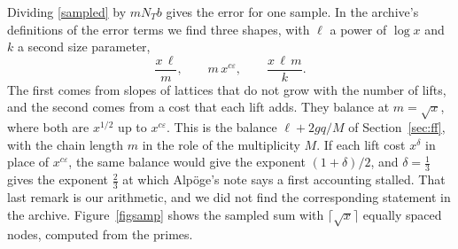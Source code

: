 \documentclass[11pt,letterpaper]{article}
\numberwithin{equation}{section}
\begin{document}
Dividing \eqref{sampled} by $mN_Tb$ gives the error for one sample. In the archive's definitions of the error terms we find three shapes, with $\ell$ a power of $\log x$ and $k$ a second size parameter,
\begin{equation}\label{balance}
\frac{x\,\ell}{m},\qquad m\,x^{c\varepsilon},\qquad\frac{x\,\ell\,m}{k}.
\end{equation}
The first comes from slopes of lattices that do not grow with the number of lifts, and the second comes from a cost that each lift adds. They balance at $m=\sqrt x$, where both are $x^{1/2}$ up to $x^{c\varepsilon}$. This is the balance $\ell+2gq/M$ of Section~\ref{sec:ff}, with the chain length $m$ in the role of the multiplicity $M$. If each lift cost $x^{\delta}$ in place of $x^{c\varepsilon}$, the same balance would give the exponent $(1+\delta)/2$, and $\delta=\tfrac13$ gives the exponent $\tfrac23$ at which Alp\"oge's note says a first accounting stalled. That last remark is our arithmetic, and we did not find the corresponding statement in the archive. Figure~\ref{figsamp} shows the sampled sum with $\lceil\sqrt x\rceil$ equally spaced nodes, computed from the primes.
\end{document}
